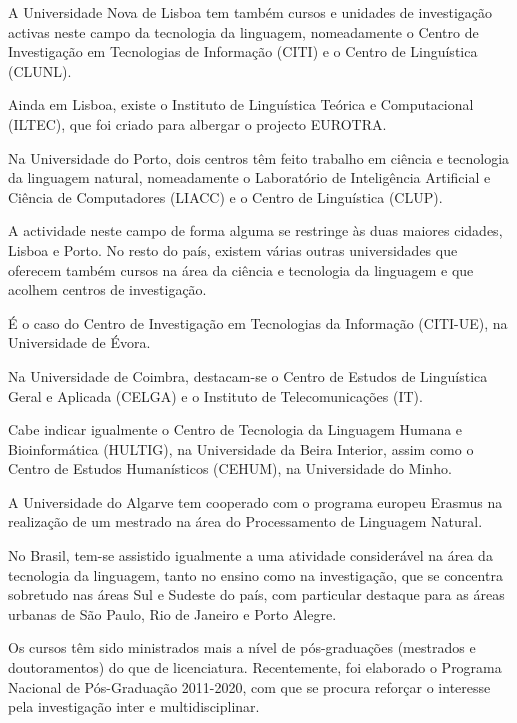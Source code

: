 \begin{multicols}{2}
A Universidade Nova de Lisboa tem também cursos e unidades de investigação activas
neste campo da tecnologia da linguagem, nomeadamente o Centro de Investigação em Tecnologias de Informação (CITI) 
e o Centro de Linguística (CLUNL).

Ainda em Lisboa, existe o Instituto de Linguística Teórica e Computacional (ILTEC), que foi criado para albergar 
o projecto EUROTRA. 

Na Universidade do Porto, dois centros têm feito trabalho em ciência e tecnologia da linguagem natural,
nomeadamente o Laboratório de Inteligência Artificial e Ciência de Computadores (LIACC) e o Centro de Linguística (CLUP).

A actividade neste campo de forma alguma se restringe às duas maiores cidades, Lisboa e Porto. 
No resto do país, existem várias outras universidades que oferecem também  cursos na área da ciência e tecnologia da linguagem 
e que acolhem centros de investigação.

É o caso do Centro de Investigação em Tecnologias da Informação (CITI-UE), na Universidade de Évora.

Na Universidade de Coimbra, destacam-se o Centro de Estudos de Linguística Geral e Aplicada (CELGA) e o 
Instituto de Telecomunicações (IT).

Cabe indicar igualmente o Centro de Tecnologia da Linguagem Humana e Bioinformática (HULTIG), na Universidade da Beira Interior,
assim como o Centro de Estudos Humanísticos (CEHUM), na Universidade do Minho.

A Universidade do Algarve tem cooperado com o programa europeu Erasmus na realização de um mestrado na área 
do Processamento de Linguagem Natural.


No Brasil, tem-se assistido igualmente a uma atividade considerável na área da tecnologia da linguagem, tanto no ensino como na investigação, 
que se concentra sobretudo nas áreas Sul e Sudeste do país, com particular destaque para as áreas urbanas de São Paulo, Rio de Janeiro e Porto Alegre. 

Os cursos têm sido ministrados mais a nível de pós-graduações (mestrados e doutoramentos) do que de licenciatura. 
Recentemente, foi elaborado o Programa Nacional de Pós-Graduação 2011-2020, com que se procura reforçar o interesse pela investigação inter e multidisciplinar.


\end{multicols}
